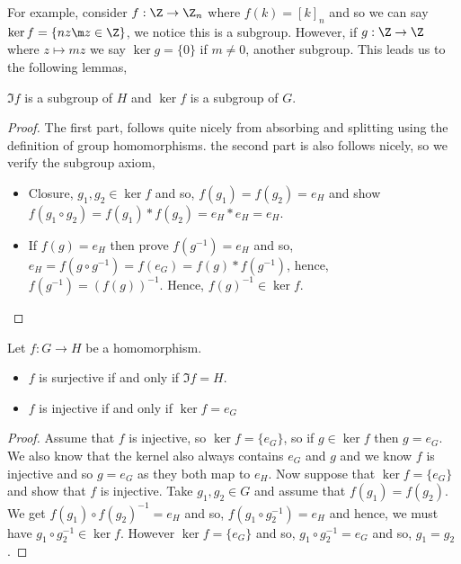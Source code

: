 For example, consider $f : \Z \to \Z_n$ where $f (k) = [k]_n$ and so we can say $\ker f = \{nz \m z \in \Z\}$, we notice this is a subgroup. However, if $g : \Z \to \Z$ where $z \mapsto mz$ we say $\ker g = \{0\}$ if $m \ne 0$, another subgroup. This leads us to the following lemmas,
\begin{nlemma}
  $\Im f$ is a subgroup of $H$ and $\ker f$ is a subgroup of $G$.
\end{nlemma}
\begin{proof}
  The first part, follows quite nicely from absorbing and splitting using the definition of group homomorphisms. the second part is also follows nicely, so we verify the subgroup axiom,
  \begin{itemize}
    \item Closure, $g_1, g_2 \in \ker f$ and so, $f(g_1) = f(g_2) = e_H$ and show $f(g_1 \circ g_2) = f(g_1) * f(g_2) = e_H * e_H = e_H$.
    \item If $f(g) = e_H$ then prove $f(g^{-1}) = e_H$ and so, $e_H = f(g \circ g^{-1}) = f(e_G) = f(g) * f(g^{-1})$, hence, $f(g^{-1}) = (f(g))^{-1}$. Hence, $f(g)^{-1} \in \ker f$.
  \end{itemize}
\end{proof}

\begin{nlemma}
  Let $f: G \to H$ be a homomorphism.
  \begin{itemize}
    \item $f$ is surjective if and only if $\Im f = H$.
    \item $f$ is injective if and only if $\ker f = e_G$
  \end{itemize}
\end{nlemma}
\begin{proof}
  Assume that $f$ is injective, so $\ker f = \{e_G\}$, so if $g \in \ker f$ then $g = e_G$. We also know that the kernel also always contains $e_G$ and $g$ and we know $f$ is injective and so $g = e_G$ as they both map to $e_H$. Now suppose that $\ker f =  \{e_G\}$ and show that $f$ is injective. Take $g_1, g_2 \in G$ and assume that $f(g_1) = f(g_2)$. We get $f(g_1) \circ f(g_2)^{-1} = e_H$ and so, $f(g_1 \circ g_2^{-1}) = e_H$ and hence, we must have $g_1 \circ g_2^{-1} \in \ker f$. However $\ker f = \{e_G\}$ and so, $g_1 \circ g_2^{-1} = e_G$ and so, $g_1 = g_2$.
\end{proof}

